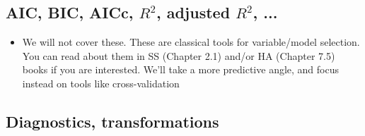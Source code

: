 \documentclass{article}
\begin{document}
\subsection{AIC, BIC, AICc, $R^2$, adjusted $R^2$, ...}

\begin{itemize}
\item We will not cover these. These are classical tools for variable/model
  selection. You can read about them in SS (Chapter 2.1) and/or HA (Chapter 7.5) 
  books if you are interested. We'll take a more predictive angle, and focus
  instead on tools like cross-validation  
\end{itemize}

\subsection{Diagnostics, transformations}
\end{document}

